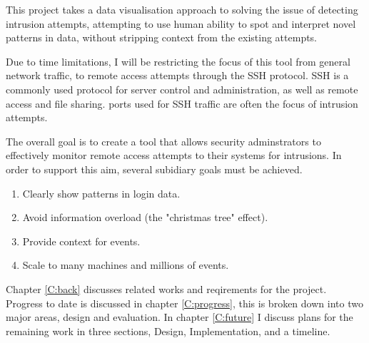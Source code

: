 This project takes a data visualisation approach to solving the issue of detecting intrusion attempts, attempting to use human ability to spot and interpret novel patterns in data, without stripping context from the existing attempts. 

Due to time limitations, I will be restricting the focus of this tool from general network traffic, to remote access attempts through the SSH protocol. SSH is a commonly used protocol for server control and administration, as well as remote access and file sharing. ports used for SSH traffic are often the focus of intrusion attempts.

The overall goal is to create a tool that allows security adminstrators to effectively monitor remote access attempts to their systems for intrusions. 
In order to support this aim, several subidiary goals must be achieved.

\begin{enumerate}
\item{Clearly show patterns in login data.}
\item{Avoid information overload (the "christmas tree" effect).}
\item{Provide context for events.}
\item{Scale to many machines and millions of events.}
\end{enumerate}

Chapter \ref{C:back} discusses related works and reqirements for the project. Progress to date is discussed in chapter \ref{C:progress}, this is broken down into two major areas, design and evaluation. In chapter \ref{C:future} I discuss plans for the remaining work in three sections, Design, Implementation, and a timeline.
